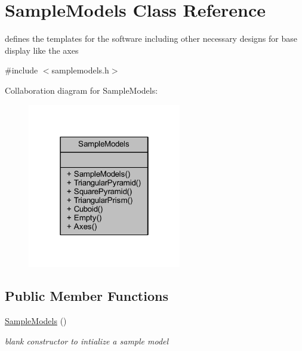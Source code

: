 \hypertarget{class_sample_models}{}\section{Sample\+Models Class Reference}
\label{class_sample_models}


defines the templates for the software including other necessary designs for base display like the axes  




{\ttfamily \#include $<$samplemodels.\+h$>$}



Collaboration diagram for Sample\+Models\+:\nopagebreak
\begin{figure}[H]
\begin{center}
\leavevmode
\includegraphics[width=190pt]{class_sample_models__coll__graph}
\end{center}
\end{figure}
\subsection*{Public Member Functions}
\begin{DoxyCompactItemize}
\item 
\mbox{\hyperlink{class_sample_models_ab4f2cabd4d134b925589e2e5e4f3b55b}{Sample\+Models}} ()
\begin{DoxyCompactList}\small\item\em blank constructor to intialize a sample model \end{DoxyCompactList}\end{DoxyCompactItemize}
